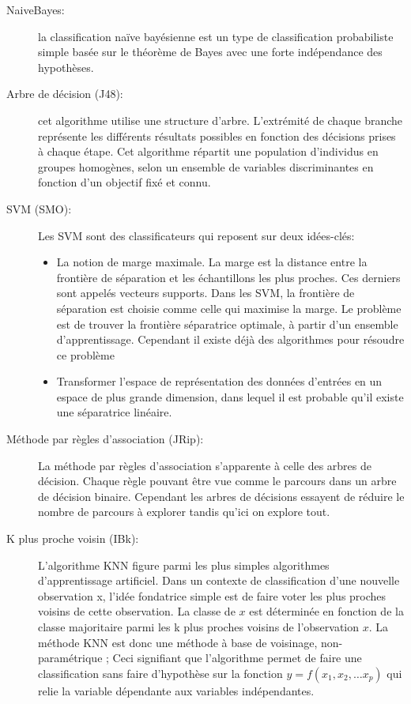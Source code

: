 \documentclass[a4paper, 11pt]{article}
\begin{document}
\begin{description}
 \item [NaiveBayes: ] la classification naïve bayésienne est un type de classification probabiliste simple basée sur le théorème de Bayes avec une forte indépendance des hypothèses. \\

 \item [Arbre de décision (J48): ] cet algorithme utilise une structure d'arbre. L'extrémité de chaque branche représente les différents résultats possibles en fonction des décisions prises à chaque étape. Cet algorithme  répartit une population d'individus en groupes homogènes, selon un ensemble de variables discriminantes en fonction d'un objectif fixé et connu.\\

 \item [SVM (SMO): ] Les SVM sont des classificateurs qui reposent sur deux idées-clés:

\begin{itemize}
 \item La notion de marge maximale. La marge est la distance entre la frontière de séparation et les échantillons les plus proches.
Ces derniers sont appelés vecteurs supports. Dans les SVM, la frontière de séparation est choisie comme celle qui maximise la marge.
Le problème est de trouver la frontière séparatrice optimale, à partir d'un ensemble d'apprentissage. Cependant il existe déjà des algorithmes pour résoudre ce problème
 \item  Transformer l'espace de représentation des données d'entrées en un espace de plus grande dimension, dans lequel il est probable qu'il existe une séparatrice linéaire. \\
\end{itemize}
 \item [Méthode par règles d'association (JRip): ] La méthode par règles d’association s’apparente à celle des arbres de décision. Chaque règle pouvant être vue comme le parcours dans un arbre de décision binaire. Cependant les arbres de décisions essayent de réduire le nombre de parcours à explorer tandis qu’ici on explore tout.\\

 \item [K plus proche voisin (IBk): ] L’algorithme KNN figure parmi les plus simples algorithmes d’apprentissage artificiel. Dans un contexte de classification d’une nouvelle observation x, l’idée fondatrice simple est de faire voter les plus proches voisins de cette observation. La classe de $x$ est déterminée en fonction de la classe majoritaire parmi les k plus proches voisins de l’observation $x$. La méthode KNN est donc une méthode à base de voisinage, non-paramétrique ; Ceci signifiant que l’algorithme permet de faire une classification sans faire d’hypothèse sur la fonction $y=f(x_1,x_2,…x_p)$ qui relie la variable dépendante aux variables indépendantes.
\end{description}
\end{document}
